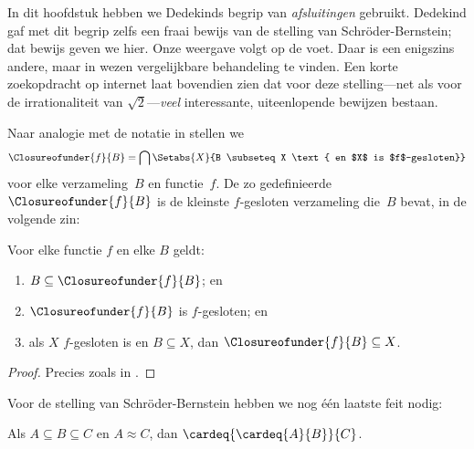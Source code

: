 \documentclass[openany]{memoir}
\begin{document}
In dit hoofdstuk hebben we Dedekinds begrip van \emph{afsluitingen}
gebruikt. Dedekind gaf met dit begrip zelfs een fraai bewijs van de
stelling van Schr\"oder-Bernstein; dat bewijs geven we hier. Onze
weergave volgt \citet[pp.~157--8]{Potter2004} op de voet. Daar is een
enigszins andere, maar in wezen vergelijkbare behandeling te vinden.
Een korte zoekopdracht op internet laat bovendien zien dat voor deze
stelling---net als voor de irrationaliteit van $\sqrt{2}$---\emph{veel}
interessante, uiteenlopende bewijzen bestaan.

Naar analogie met de notatie in
 stellen we
\[
\Closureofunder{f}{B} = \bigcap \Setabs{X}{B \subseteq X
\text{ en $X$ is $f$-gesloten}}
\]
voor elke verzameling~$B$ en functie~$f$. De zo gedefinieerde
$\Closureofunder{f}{B}$ is de kleinste $f$-gesloten verzameling die~$B$
bevat, in de volgende zin:

\begin{lem}
	Voor elke functie $f$ en elke $B$ geldt:
	\begin{enumerate}
		\item{} $B \subseteq \Closureofunder{f}{B}$; en
		\item{} $\Closureofunder{f}{B}$ is $f$-gesloten; en
		\item{} als $X$ $f$-gesloten is en $B
		\subseteq X$, dan $\Closureofunder{f}{B} \subseteq X$.
	\end{enumerate}
\end{lem}

\begin{proof}
Precies zoals in .
\end{proof}

Voor de stelling van Schr\"oder-Bernstein hebben we nog één laatste feit
nodig:

\begin{prop}
Als $A \subseteq B \subseteq C$ en $A \approx C$, dan $\cardeq{\cardeq{A}{B}}{C}$.
\end{prop}
\end{document}
